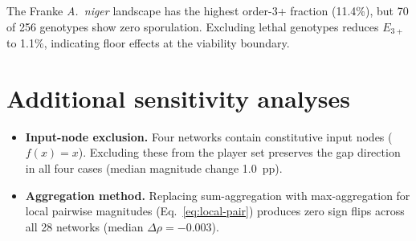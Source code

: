 \documentclass[10pt]{article}
\begin{document}
The Franke \emph{A.~niger} landscape has the highest order-3+
fraction (11.4\%), but 70 of 256 genotypes show zero sporulation.
Excluding lethal genotypes reduces $E_{3+}$ to 1.1\%, indicating
floor effects at the viability boundary.


\section{Additional sensitivity analyses}
\label{supp:sensitivity}

\begin{itemize}
\item \textbf{Input-node exclusion.} Four networks contain
  constitutive input nodes ($f(x) = x$). Excluding these from the
  player set preserves the gap direction in all four cases (median
  magnitude change 1.0~pp).
\item \textbf{Aggregation method.} Replacing sum-aggregation with
  max-aggregation for local pairwise magnitudes
  (Eq.~\ref{eq:local-pair}) produces zero sign flips across all 28
  networks (median $\Delta\rho = -0.003$).
\end{itemize}
\end{document}
